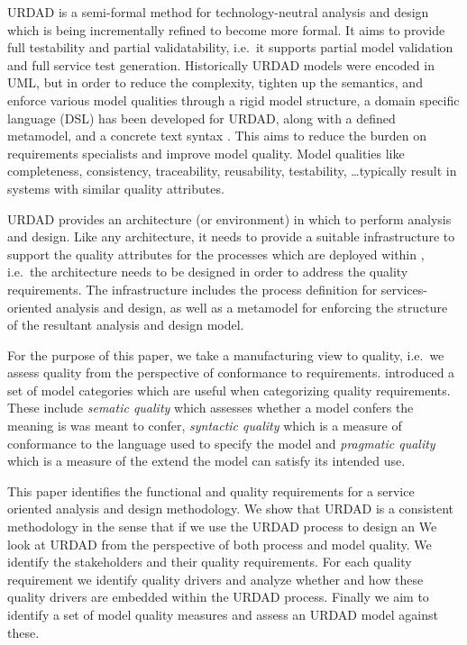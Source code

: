 URDAD is a semi-formal method for technology-neutral analysis and design \cite{solms_urdad_2010} which is being incrementally refined to become more formal. It aims to provide full testability and partial validatability, i.e.\ it supports partial model validation and full service test generation. Historically URDAD models were encoded in UML, but in order to reduce the complexity, tighten up the semantics, and enforce various model qualities through a rigid model structure, a domain specific language (DSL) has been developed for URDAD, along with a defined metamodel, and a concrete text syntax \cite{solmsfritz_domain-specific_????}. This aims to reduce the burden on requirements specialists and improve model quality. Model qualities like completeness, consistency, traceability, reusability, testability, \dots typically result in systems with similar quality attributes\cite{findItIfYouCan}.

URDAD provides an architecture (or environment) in which to perform analysis and design. Like any architecture, it needs to provide a suitable infrastructure to support the quality attributes for the processes which are deployed within \cite{}, i.e.\ the architecture needs to be designed in order to address the quality requirements. The infrastructure includes the process definition for services-oriented analysis and design, as well as a metamodel for enforcing the structure of the resultant analysis and design model.

For the purpose of this paper, we take a manufacturing view \cite{garvin_what_1984} to quality, i.e.\  we assess quality from the perspective of conformance to requirements. \cite{lindland_understanding_1994} introduced a set of model categories which are useful when categorizing quality requirements. These include \emph{sematic quality} which assesses whether a model confers the meaning is was meant to confer, \emph{syntactic quality} which is a measure of conformance to the language used to specify the model and \emph{pragmatic quality} which is a measure of the extend the model can satisfy its intended use.

This paper identifies the functional and quality requirements for a service oriented analysis and design methodology. We show that URDAD is a consistent methodology in the sense that if we use the URDAD process to design an
We look at URDAD from the perspective of both process and model quality. We identify the stakeholders and their quality requirements. For each quality requirement we identify quality drivers and analyze whether and how these quality drivers are embedded within the URDAD process. Finally we aim to identify a set of model quality measures and assess an URDAD model against these.

